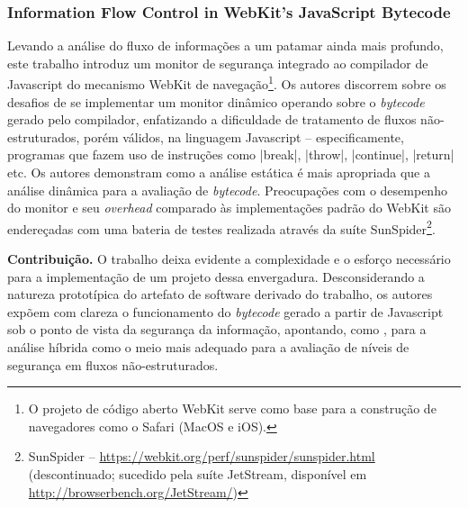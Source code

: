\subsubsection{Information Flow Control in WebKit's JavaScript Bytecode \cite{Bichhawat2014}}
Levando a análise do fluxo de informações a um patamar ainda mais profundo, este trabalho introduz um monitor de segurança integrado ao compilador de Javascript do mecanismo WebKit de navegação\footnote{O projeto de código aberto WebKit serve como base para a construção de navegadores como o Safari (MacOS e iOS).}. Os autores discorrem sobre os desafios de se implementar um monitor dinâmico operando sobre o \textit{bytecode} gerado pelo compilador, enfatizando a dificuldade de tratamento de fluxos não-estruturados, porém válidos, na linguagem Javascript -- especificamente, programas que fazem uso de instruções como |break|, |throw|, |continue|, |return| etc. Os autores demonstram como a análise estática é mais apropriada que a análise dinâmica para a avaliação de \textit{bytecode}. Preocupações com o desempenho do monitor e seu \textit{overhead} comparado às implementações padrão do WebKit são endereçadas com uma bateria de testes realizada através da suíte SunSpider\footnote{SunSpider -- \url{https://webkit.org/perf/sunspider/sunspider.html} (descontinuado; sucedido pela suíte JetStream, disponível em \url{http://browserbench.org/JetStream/})}.

\textbf{Contribuição.} O trabalho deixa evidente a complexidade e o esforço necessário para a implementação de um projeto dessa envergadura. Desconsiderando a natureza prototípica do artefato de software derivado do trabalho, os autores expõem com clareza o funcionamento do \textit{bytecode} gerado a partir de Javascript sob o ponto de vista da segurança da informação, apontando, como \cite{Hedin2014}, para a análise híbrida como o meio mais adequado para a avaliação de níveis de segurança em fluxos não-estruturados.


